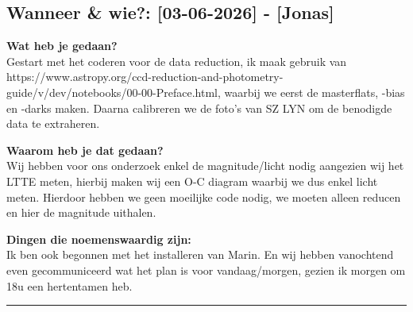 
\subsection*{Wanneer \& wie?: [03-06-2026] - [Jonas]}

\textbf{Wat heb je gedaan?}\\
Gestart met het coderen voor de data reduction, ik maak gebruik van https://www.astropy.org/ccd-reduction-and-photometry-guide/v/dev/notebooks/00-00-Preface.html, waarbij we eerst de masterflats, -bias en -darks maken. Daarna calibreren we de foto's van SZ LYN om de benodigde data te extraheren.
\vspace{0.3cm} 

\noindent \textbf{Waarom heb je dat gedaan?}\\
Wij hebben voor ons onderzoek enkel de magnitude/licht nodig aangezien wij het LTTE meten, hierbij maken wij een O-C diagram waarbij we dus enkel licht meten. Hierdoor hebben we geen moeilijke code nodig, we moeten alleen reducen en hier de magnitude uithalen.

\noindent \textbf{Dingen die noemenswaardig zijn:}\\
Ik ben ook begonnen met het installeren van Marin. En wij hebben vanochtend even gecommuniceerd wat het plan is voor vandaag/morgen, gezien ik morgen om 18u een hertentamen heb.


\vspace{0.5cm}
\hrule 
\vspace{0.5cm}


